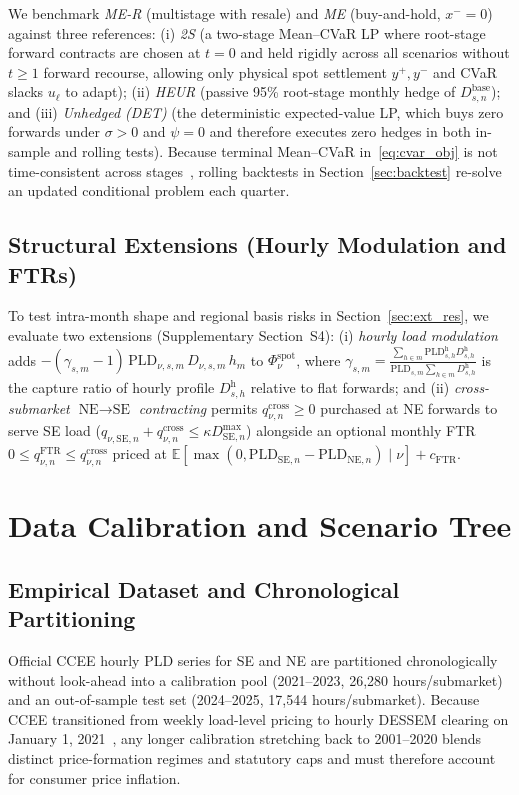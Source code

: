 \documentclass[10pt,journal]{IEEEtran}
\begin{document}
We benchmark \textit{ME-R} (multistage with resale) and \textit{ME} (buy-and-hold, $x^- = 0$) against three references: (i) \textit{2S} (a two-stage Mean--CVaR LP where root-stage forward contracts are chosen at $t=0$ and held rigidly across all scenarios without $t \ge 1$ forward recourse, allowing only physical spot settlement $y^+, y^-$ and CVaR slacks $u_\ell$ to adapt); (ii) \textit{HEUR} (passive 95\% root-stage monthly hedge of $D^{\text{base}}_{s,n}$); and (iii) \textit{Unhedged (DET)} (the deterministic expected-value LP, which buys zero forwards under $\sigma > 0$ and $\psi = 0$ and therefore executes zero hedges in both in-sample and rolling tests). Because terminal Mean--CVaR in~\eqref{eq:cvar_obj} is not time-consistent across stages~\cite{Shapiro2009,Shapiro2021}, rolling backtests in Section~\ref{sec:backtest} re-solve an updated conditional problem each quarter.

\subsection{Structural Extensions (Hourly Modulation and FTRs)}
\label{sec:ext_math}
To test intra-month shape and regional basis risks in Section~\ref{sec:ext_res}, we evaluate two extensions (Supplementary Section~S4): (i) \textit{hourly load modulation} adds $-(\gamma_{s,m} - 1)\,\text{PLD}_{\nu,s,m}\,D_{\nu,s,m}\,h_m$ to $\Phi^{\text{spot}}_\nu$, where $\gamma_{s,m} = \frac{\sum_{h \in m} \text{PLD}^{\text{h}}_{s,h} D^{\text{h}}_{s,h}}{\text{PLD}_{s,m} \sum_{h \in m} D^{\text{h}}_{s,h}}$ is the capture ratio of hourly profile $D^{\text{h}}_{s,h}$ relative to flat forwards; and (ii) \textit{cross-submarket $\text{NE}\to\text{SE}$ contracting} permits $q^{\text{cross}}_{\nu,n} \ge 0$ purchased at NE forwards to serve SE load ($q_{\nu,\text{SE},n} + q^{\text{cross}}_{\nu,n} \le \kappa D^{\max}_{\text{SE},n}$) alongside an optional monthly FTR $0 \le q^{\text{FTR}}_{\nu,n} \le q^{\text{cross}}_{\nu,n}$ priced at $\mathbb{E}[\max(0, \text{PLD}_{\text{SE},n} - \text{PLD}_{\text{NE},n}) \mid \nu] + c_{\text{FTR}}$.

\section{Data Calibration and Scenario Tree}
\label{sec:data}

\subsection{Empirical Dataset and Chronological Partitioning}
Official CCEE hourly PLD series for SE and NE are partitioned chronologically without look-ahead into a calibration pool (2021--2023, 26,280 hours/submarket) and an out-of-sample test set (2024--2025, 17,544 hours/submarket). Because CCEE transitioned from weekly load-level pricing to hourly DESSEM clearing on January 1, 2021~\cite{Santos2020}, any longer calibration stretching back to 2001--2020 blends distinct price-formation regimes and statutory caps and must therefore account for consumer price inflation.
\end{document}
